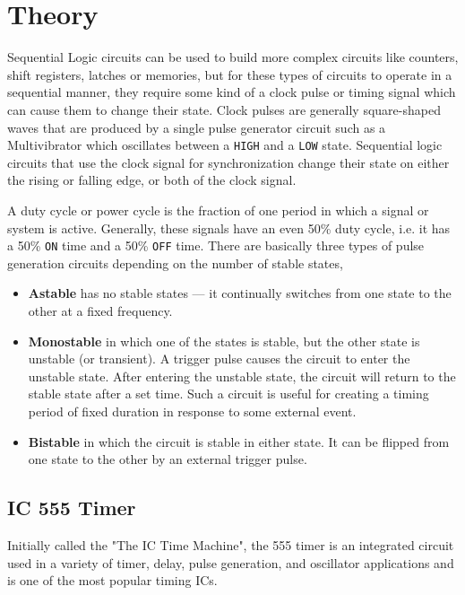 \section{Theory}

Sequential Logic circuits can be used to build more complex circuits like counters, shift registers, latches or memories, but for these types of circuits to operate in a sequential manner, they require some kind of a clock pulse or timing signal which can cause them to change their state. Clock pulses are generally square-shaped waves that
are produced by a single pulse generator circuit such as a Multivibrator which oscillates
between a \verb|HIGH| and a \verb|LOW| state. Sequential logic circuits that use the
clock signal for synchronization change their state on either the rising or falling
edge, or both of the clock signal.

A duty cycle or power cycle is the fraction of one period in which a signal or system is active. Generally, these signals have an even 50\% duty cycle, i.e.
it has a 50\% \verb|ON| time and a 50\% \verb|OFF| time.  There are basically three types of pulse
generation circuits depending on the number of stable states,

\begin{itemize}
    \item \textbf{Astable} has no stable states — it continually switches from one state to the other at a fixed frequency.
    \item \textbf{Monostable} in which one of the states is stable, but the other state is unstable (or transient). A trigger pulse causes the circuit to enter the unstable state. After entering the unstable state, the circuit will return to the stable state after a set time. Such a circuit is useful for creating a timing period of fixed duration in response to some external event.
    \item \textbf{Bistable} in which the circuit is stable in either state. It can be flipped from one state to the other by an external trigger pulse.
\end{itemize}

\subsection*{IC 555 Timer}
Initially called the "The IC Time Machine", the 555 timer is an integrated circuit used in a variety of timer, delay, pulse generation, and oscillator applications and is one of the most popular timing ICs.

